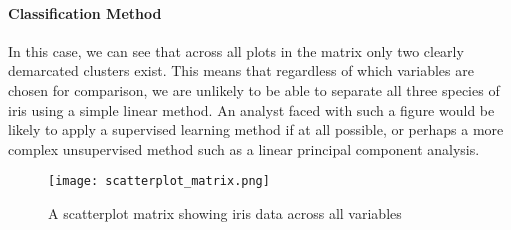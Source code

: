 \paragraph{Classification Method}
In this case, we can see that across all plots in the matrix only two clearly demarcated clusters exist. This means that regardless of which variables are chosen for comparison, we are unlikely to be able to separate all three species of iris using a simple linear method. An analyst faced with such a figure would be likely to apply a supervised learning method if at all possible, or perhaps a more complex unsupervised method such as a linear principal component analysis. 

\begin{figure}
	\centering
	\texttt{[image: scatterplot\_matrix.png]}
	\caption{A scatterplot matrix showing iris data across all variables}
	\label{fig:scatterplot_matrix}
\end{figure}
